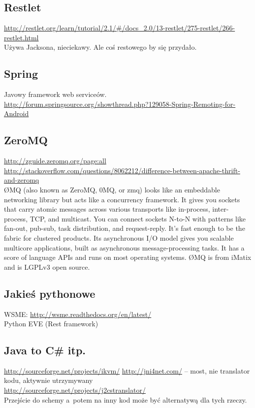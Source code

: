 \subsection{Restlet}
\url{http://restlet.org/learn/tutorial/2.1/#/docs_2.0/13-restlet/275-restlet/266-restlet.html}\\
Używa Jacksona, nieciekawy. Ale coś restowego by się przydało.


\subsection{Spring}
Javowy framework web serviceów.
\url{http://forum.springsource.org/showthread.php?129058-Spring-Remoting-for-Android}\\


\subsection{ZeroMQ}
\url{http://zguide.zeromq.org/page:all}
\url{http://stackoverflow.com/questions/8062212/difference-between-apache-thrift-and-zeromq}\\
ØMQ (also known as ZeroMQ, 0MQ, or zmq) looks like an embeddable networking library but acts like a concurrency framework. It gives you sockets that carry atomic messages across various transports like in-process, inter-process, TCP, and multicast. You can connect sockets N-to-N with patterns like fan-out, pub-sub, task distribution, and request-reply. It's fast enough to be the fabric for clustered products. Its asynchronous I/O model gives you scalable multicore applications, built as asynchronous message-processing tasks. It has a score of language APIs and runs on most operating systems. ØMQ is from iMatix and is LGPLv3 open source.



\subsection{Jakieś pythonowe}
WSME: \url{http://wsme.readthedocs.org/en/latest/}\\
Python EVE (Rest framework)\\


\subsection{Java to C\# itp.}
\url{http://sourceforge.net/projects/ikvm/}
\url{http://jni4net.com/} -- most, nie translator kodu, aktywnie utrzymywany \\
\url{http://sourceforge.net/projects/j2cstranslator/}\\
Przejście do schemy a~potem na inny kod może być alternatywą dla tych rzeczy.


